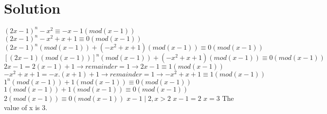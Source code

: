 \documentclass[11pt]{article}
\begin{document}
\section*{Solution}
 $(2x-1)^n - x^2 \equiv -x -1 (mod(x-1))$ \newline \newline
 $(2x-1)^n -x^2 + x + 1 \equiv 0 (mod(x-1))$ \newline \newline
 $(2x-1)^n(mod(x-1)) + (-x^2+x+1)(mod(x-1)) \equiv 0(mod(x-1))$ \newline \newline
 $[(2x-1)(mod(x-1))]^n(mod(x-1)) + (-x^2+x+1)(mod(x-1)) \equiv 0(mod(x-1))$ \newline \newline
 \indent \indent $2x-1 = 2(x-1) + 1 \rightarrow remainder = 1 \rightarrow 2x-1 \equiv 1 (mod(x-1))$ \newline \newline
 \indent \indent $-x^2+x+1 = -x.(x+1) + 1 \rightarrow remainder = 1 \rightarrow -x^2+x+1 \equiv 1(mod(x-1))$ \newline \newline
$1^n(mod(x-1)) + 1(mod(x-1)) \equiv 0(mod(x-1))$ \newline \newline
$1(mod(x-1)) + 1(mod(x-1)) \equiv 0(mod(x-1))$ \newline \newline
$2 (mod(x-1)) \equiv 0 (mod(x-1))$ \newline \newline
    \indent \indent $x-1 \mid 2 , x > 2$ \newline \newline
$x - 1 = 2$\newline \newline
$x = 3$
\noindent \newline \newline
The value of x is 3.
\end{document}
